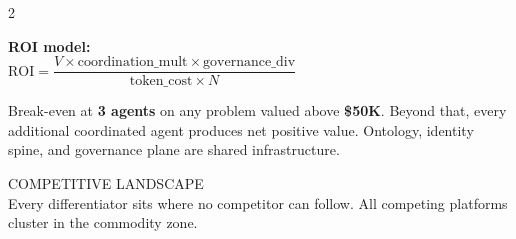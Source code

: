 \documentclass[10pt,a4paper]{article}
\newcommand{\sectiontag}[1]{%
  \vspace{6pt}%
  {\footnotesize\color{gold}\MakeUppercase{#1}}\\[-1pt]%
}
\begin{document}
\begin{multicols}{2}
\vspace{4pt}

{\small\textbf{ROI model:}}\\
{\small $\mathrm{ROI} = \dfrac{V \times \mathrm{coordination\_mult} \times \mathrm{governance\_div}}{\mathrm{token\_cost} \times N}$}

\vspace{4pt}
{\small Break-even at \textbf{3 agents} on any problem valued above \textbf{\$50K}. Beyond that, every additional coordinated agent produces net positive value. Ontology, identity spine, and governance plane are shared infrastructure.}

\end{multicols}

\sectiontag{Competitive Landscape}

{\small Every differentiator sits where no competitor can follow. All competing platforms cluster in the commodity zone.}

\vspace{4pt}
\end{document}
